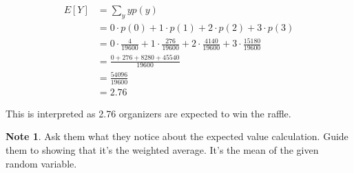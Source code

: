 \documentclass[11pt]{article}
\theoremstyle{definition}
\newtheorem{note}{Note}
\begin{document}
$$
	\begin{aligned}
		E[Y] & = \sum_y yp(y) \\
		& = 0 \cdot p(0) + 1 \cdot p(1) + 2 \cdot p(2) + 3 \cdot p(3) \\
		& = 0 \cdot \frac{4}{19600} + 1 \cdot \frac{276}{19600} + 2 \cdot \frac{4140}{19600} + 3 \cdot \frac{15180}{19600} \\
		& = \frac{0 + 276 + 8280 + 45540}{19600} \\
		& = \frac{54096}{19600} \\
		& = 2.76
	\end{aligned}
$$

This is interpreted as 2.76 organizers are expected to win the raffle.

\begin{note}
	Ask them what they notice about the expected value calculation. Guide them to showing that it's the weighted average. It's the mean of the given random variable.
\end{note}
\end{document}
